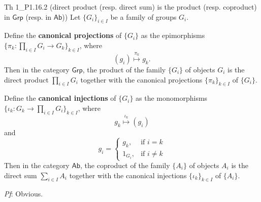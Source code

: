 \documentclass{article}
\begin{document}
\begin{Th}{Th 1\_P1.16.2 (direct product (resp. direct sum) is the product (resp. coproduct) in $\mathsf{Grp}$ (resp. in $\mathsf{Ab}$))}
    Let $\{G_i\}_{i\in I}$ be a family of groups $G_i$.
    \begin{compactenum}
        \item \textcolor{Df}{Define the \textbf{canonical projections} of $\{G_i\}$ as the} epimorphisms \textcolor{Df}{$ \big\{\pi_k: \prod_{i\in I} G_i \to G_k\big\}_{k\in I} $, where
        $$ (g_i) \overset{\pi_k}{\mapsto} g_k. $$}
        Then in the category $\mathsf{Grp}$, the product of the family $\{G_i\}$ of objects $G_i$ is the direct product $\prod_{i\in I} G_i$ together with the canonical projections $\{\pi_k\}_{k\in I}$ of $\{G_i\}$.
        \item \textcolor{Df}{Define the \textbf{canonical injections} of $\{G_i\}$ as the} monomorphisms \textcolor{Df}{$ \big\{\iota_k: G_k \to \prod_{i\in I} G_i\big\}_{k\in I} $, where
        $$ g_k \overset{\iota_k}{\mapsto} (g_i) $$
        and 
        $$ g_i = \begin{cases}
            g_k, & \text{if } i = k \\
            1_{G_i}, & \text{if } i \neq k
        \end{cases} $$}
        Then in the category $\mathsf{Ab}$, the coproduct of the family $\{A_i\}$ of objects $A_i$ is the direct sum $\sum_{i\in I} A_i$ together with the canonical injections $\{\iota_k\}_{k\in I}$ of $\{A_i\}$.
    \end{compactenum}
    \tcblower
    \textit{Pf}: Obvious.
\end{Th}
\end{document}
